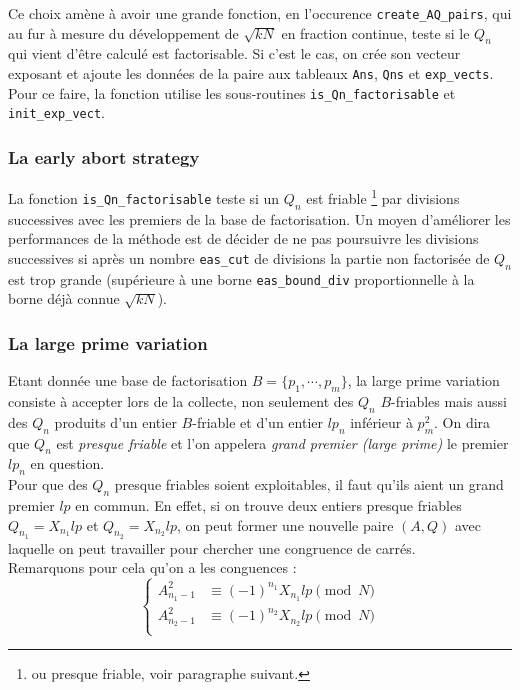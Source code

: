 Ce choix amène à avoir une grande fonction, en l'occurence 
\texttt{create\_AQ\_pairs}, qui au fur à mesure du développement de $\sqrt{kN}$
en fraction continue, teste si le $Q_n$ qui vient d'être calculé est factorisable.
Si c'est le cas, on crée son vecteur exposant et ajoute les données de la paire
aux tableaux \texttt{Ans}, \texttt{Qns} et \texttt{exp\_vects}. Pour ce faire, la
fonction utilise les sous-routines \texttt{is\_Qn\_factorisable} et 
\texttt{init\_exp\_vect}.

\subsubsection{La \og early abort strategy \fg{}}

La fonction \texttt{is\_Qn\_factorisable} teste si un $Q_n$ est friable 
\footnote {ou presque friable, voir paragraphe suivant.} par divisions successives
avec les premiers de la base de factorisation.  Un moyen d'améliorer les 
performances de la méthode est de décider de ne pas poursuivre les divisions 
successives si après un nombre \texttt{eas\_cut} de divisions la partie non
factorisée de $Q_n$ est trop grande (supérieure à une borne 
\texttt{eas\_bound\_div} proportionnelle à la borne déjà connue $\sqrt{kN}$). 

\subsubsection{La \og large prime variation \fg{}}

Etant donnée une base de factorisation $B = \{ p_1, \cdots, p_m\}$, la \og large
prime variation \fg{} consiste à accepter lors de la collecte, non seulement des 
$Q_n$ $B$-friables mais aussi des $Q_n$ produits d'un entier $B$-friable et d'un
entier $lp_n$ inférieur à $p_m^2$. On dira que $Q_n$ est \emph{presque friable}
et l'on appelera \emph{grand premier (large prime)} le premier $lp_n$ en question. \\

Pour que des $Q_n$ presque friables soient exploitables, il faut qu'ils aient
un grand premier $lp$ en commun. En effet, si on trouve deux entiers presque
friables $Q_{n_1} = X_{n_1}lp $ et $Q_{n_2} =  X_{n_2}lp $, on peut former une
nouvelle paire $(A,Q)$ avec laquelle on peut travailler pour chercher une 
congruence de carrés. \\ 

Remarquons pour cela qu'on a les conguences :
\begin{equation*}
  \left\{
      \begin{aligned}
          A_{n_1 -1}^2 &\equiv (-1)^{n_1} X_{n_1}lp\pmod{N} \\
          A_{n_2 -1}^2 &\equiv (-1)^{n_2} X_{n_2}lp\pmod{N}\\
        \end{aligned}
    \right.
\end{equation*}

